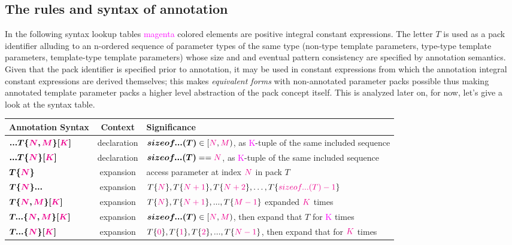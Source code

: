 
\subsection{The rules and syntax of annotation}

\p In the following syntax lookup tables \textcolor{Magenta}{magenta} colored elements are positive integral constant expressions.
The letter $T$ is used as a pack identifier alluding to an n-ordered sequence of parameter types of the same type (non-type template parameters, type-type template parameters, template-type template parameters) whose size and and eventual pattern consistency are specified by annotation semantics.
Given that the pack identifier is specified prior to annotation, it may be used in constant expressions from which the annotation integral constant expressions are derived themselves; this makes \textit{equivalent forms} with non-annotated parameter packs possible thus making annotated template parameter packs a higher level abstraction of the pack concept itself.
This is analyzed later on, for now, let's give a look at the syntax table.

\begin{tabularx}{\textwidth}{l|c|X}
  \textbf{Annotation Syntax} & \textbf{Context}  &\textbf{Significance} \\
\hline
$\bm{...T\{\textcolor{Magenta}{\textcolor{Magenta}{N}},\textcolor{Magenta}{M}\}[\textcolor{Magenta}{K}]}$ & declaration & $\bm{sizeof...(T)} \in [\textcolor{Magenta}{N},\textcolor{Magenta}{M})$, as \textcolor{Magenta}{K}-tuple of the same included sequence \\
$\bm{...T\{\textcolor{Magenta}{N}\}[\textcolor{Magenta}{K}]}$ & declaration & $\bm{sizeof...(T)} == \textcolor{Magenta}{N}$, as \textcolor{Magenta}{K}-tuple of the same included sequence \\
$\bm{T\{\textcolor{Magenta}{N}\}}$ & expansion & access parameter at index $\textcolor{Magenta}{N}$ in pack $T$ \\
$\bm{T\{\textcolor{Magenta}{N}\}...}$ & expansion& $T\{\textcolor{Magenta}{N}\},T\{\textcolor{Magenta}{N+1}\},T\{\textcolor{Magenta}{N+2}\},\dots{},T\{\textcolor{Magenta}{sizeof...(T)-1}\}$ \\
$\bm{T\{\textcolor{Magenta}{N},\textcolor{Magenta}{M}\}[\textcolor{Magenta}{K}]}$ & expansion & $T\{\textcolor{Magenta}{N}\},T\{\textcolor{Magenta}{N+1}\},...,T\{\textcolor{Magenta}{M-1}\}$ expanded $\textcolor{Magenta}{K}$ times \\
$\bm{T...\{\textcolor{Magenta}{N},\textcolor{Magenta}{M}\}[\textcolor{Magenta}{K}]}$ & expansion & $\bm{sizeof...(T)} \in [\textcolor{Magenta}{N},\textcolor{Magenta}{M})$, then expand that $T$ for \textcolor{Magenta}{K} times   \\
$\bm{T...\{\textcolor{Magenta}{N}\}[\textcolor{Magenta}{K}]}$ & expansion & $T\{\textcolor{Magenta}{0}\},T\{\textcolor{Magenta}{1}\},T\{\textcolor{Magenta}{2}\},...,T\{\textcolor{Magenta}{N-1}\}$, then expand that for $\textcolor{Magenta}{K}$ times\\
\end{tabularx}

